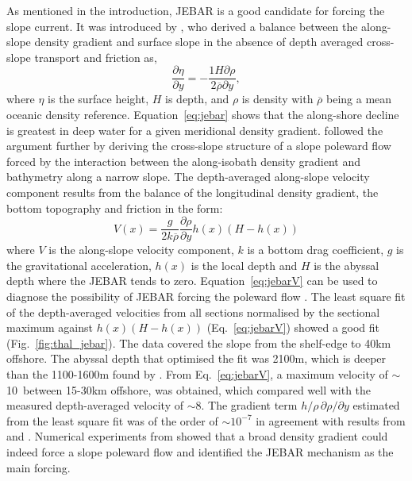 As mentioned in the introduction, JEBAR is a good candidate for
forcing the slope current. It was introduced by
\citet{Sarkisyan71}, who derived a balance between the along-slope
density gradient and surface slope in the absence of depth
averaged cross-slope transport and friction as,
\begin{equation}\label{eq:jebar}
\frac{\partial \eta}{\partial y}=-\frac{1 H \partial
\rho}{2\overline{\rho}\partial y},
\end{equation}
where $\eta$ is the surface height, $H$ is depth, and $\rho$ is
density with $\overline{\rho}$ being a mean oceanic density
reference. Equation~\ref{eq:jebar} shows that the along-shore
decline is greatest in deep water for a given meridional density
gradient. \citet{Huthnance84} followed the argument further by
deriving the cross-slope structure of a slope poleward flow forced
by the interaction between the along-isobath density gradient and
bathymetry along a narrow slope. The depth-averaged along-slope
velocity component results from the balance of the longitudinal
density gradient, the bottom topography and friction in the form:
\begin{equation}\label{eq:jebarV}
V(x)=\frac{g}{2k\overline{\rho}}\frac{\partial \rho}{\partial
y}h(x)(H-h(x))
\end{equation}
where $V$ is the along-slope velocity component, $k$ is a bottom
drag coefficient, $g$ is the gravitational acceleration, $h(x)$ is
the local depth and $H$ is the abyssal depth where the JEBAR tends
to zero. Equation~\ref{eq:jebarV} can be used to diagnose the
possibility of JEBAR forcing the poleward flow \citep{Souza01}.
The least square fit of the depth-averaged velocities from all
sections normalised by the sectional maximum against
$h(x)(H-h(x))$ (Eq.~\ref{eq:jebarV}) showed a good fit
(Fig.~\ref{fig:thal_jebar}). The data covered the slope from the
shelf-edge to 40km offshore. The abyssal depth that optimised the
fit was 2100m, which is deeper than the 1100-1600m found by
\citet{Souza01}. From Eq.~\ref{eq:jebarV}, a maximum velocity of
$\sim$10\velc\, between 15-30km offshore, was obtained, which
compared well with the measured depth-averaged velocity of
$\sim$8\velc. The gradient term $h/\rho\, \partial \rho/\partial
y$ estimated from the least square fit was of the order of $\sim
10^{-7}$ in agreement with results from \citet{Souza01} and
\citet{Huthnance84}. Numerical experiments from \citet{Dubert98}
showed that a broad density gradient could indeed force a slope
poleward flow and identified the JEBAR mechanism as the main
forcing.

